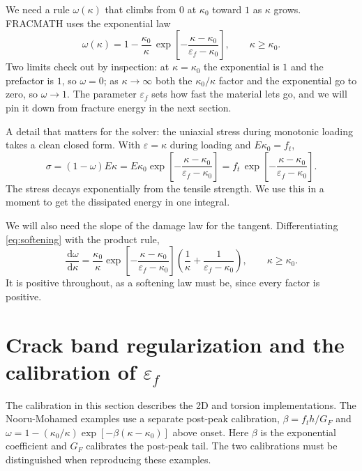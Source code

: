 \documentclass[11pt]{article}
\newcommand{\dd}{\,\mathrm{d}}
\begin{document}
We need a rule $\omega(\kappa)$ that climbs from $0$ at $\kappa_0$ toward $1$ as $\kappa$
grows. FRACMATH uses the exponential law
%
\begin{equation}
\omega(\kappa) = 1 - \frac{\kappa_0}{\kappa}\,
\exp\!\left[-\frac{\kappa-\kappa_0}{\varepsilon_f-\kappa_0}\right],
\qquad \kappa \ge \kappa_0 .
\label{eq:softening}
\end{equation}
%
Two limits check out by inspection: at $\kappa=\kappa_0$ the exponential is $1$ and the
prefactor is $1$, so $\omega=0$; as $\kappa\to\infty$ both the $\kappa_0/\kappa$ factor and
the exponential go to zero, so $\omega\to1$. The parameter $\varepsilon_f$ sets how fast the
material lets go, and we will pin it down from fracture energy in the next section.

A detail that matters for the solver: the uniaxial stress during monotonic loading takes a
clean closed form. With $\varepsilon=\kappa$ during loading and $E\kappa_0=f_t$,
%
\begin{equation}
\sigma = (1-\omega)E\kappa
       = E\kappa_0\exp\!\left[-\frac{\kappa-\kappa_0}{\varepsilon_f-\kappa_0}\right]
       = f_t\,\exp\!\left[-\frac{\kappa-\kappa_0}{\varepsilon_f-\kappa_0}\right].
\label{eq:softstress}
\end{equation}
%
The stress decays exponentially from the tensile strength. We use this in a moment to get
the dissipated energy in one integral.

We will also need the slope of the damage law for the tangent. Differentiating
\eqref{eq:softening} with the product rule,
%
\begin{equation}
\frac{\dd\omega}{\dd\kappa}
= \frac{\kappa_0}{\kappa}\exp\!\left[-\frac{\kappa-\kappa_0}{\varepsilon_f-\kappa_0}\right]
\left(\frac{1}{\kappa} + \frac{1}{\varepsilon_f-\kappa_0}\right),
\qquad \kappa \ge \kappa_0 .
\label{eq:domega}
\end{equation}
%
It is positive throughout, as a softening law must be, since every factor is positive.

\section{Crack band regularization and the calibration of $\varepsilon_f$}

The calibration in this section describes the 2D and torsion implementations.
The Nooru-Mohamed examples use a separate post-peak calibration,
$\beta=f_t h/G_F$ and
$\omega=1-(\kappa_0/\kappa)\exp[-\beta(\kappa-\kappa_0)]$ above onset.
Here $\beta$ is the exponential coefficient and $G_F$ calibrates the post-peak tail.
The two calibrations must be distinguished when reproducing these examples.
\end{document}
